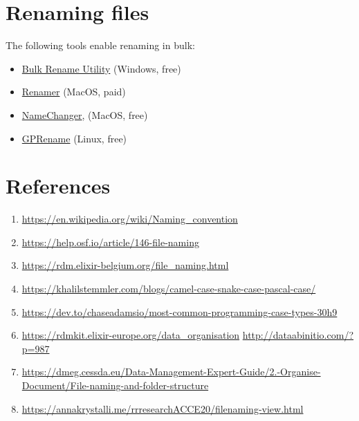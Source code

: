 \documentclass[
  letterpaper,
  DIV=11,
  numbers=noendperiod]{scrreprt}
\providecommand{\tightlist}{%
  \setlength{\itemsep}{0pt}\setlength{\parskip}{0pt}}\usepackage{longtable,booktabs,array}
\begin{document}
\section*{Renaming files}\label{renaming-files}


The following tools enable renaming in bulk:

\begin{itemize}
\tightlist
\item
  \href{https://www.bulkrenameutility.co.uk/}{Bulk Rename Utility}
  (Windows, free)
\item
  \href{https://renamer.com/}{Renamer} (MacOS, paid)
\item
  \href{https://mrrsoftware.com/namechanger/}{NameChanger}, (MacOS,
  free)
\item
  \href{https://gprename.sourceforge.net/}{GPRename} (Linux, free)
\end{itemize}

\section*{References}\label{references-1}


\begin{enumerate}
\def\labelenumi{\arabic{enumi}.}
\tightlist
\item
  \url{https://en.wikipedia.org/wiki/Naming_convention}
\item
  \url{https://help.osf.io/article/146-file-naming}
\item
  \url{https://rdm.elixir-belgium.org/file_naming.html}
\item
  \url{https://khalilstemmler.com/blogs/camel-case-snake-case-pascal-case/}
\item
  \url{https://dev.to/chaseadamsio/most-common-programming-case-types-30h9}
\item
  \url{https://rdmkit.elixir-europe.org/data_organisation}
  \url{http://dataabinitio.com/?p=987}
\item
  \url{https://dmeg.cessda.eu/Data-Management-Expert-Guide/2.-Organise-Document/File-naming-and-folder-structure}
\item
  \url{https://annakrystalli.me/rrresearchACCE20/filenaming-view.html}
\end{enumerate}

\end{document}
